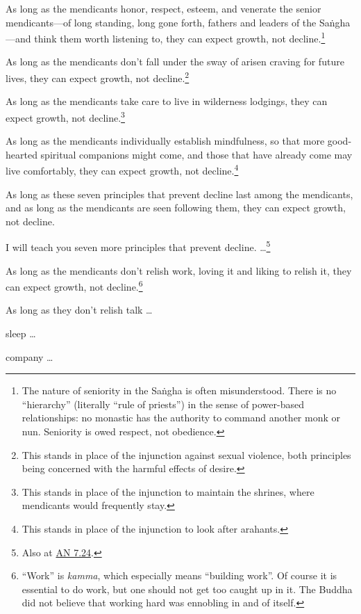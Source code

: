 \documentclass[12pt,openany]{book}%
\begin{document}
As long as the mendicants honor, respect, esteem, and venerate the senior mendicants—of long standing, long gone forth, fathers and leaders of the \textsanskrit{Saṅgha}—and think them worth listening to, they can expect growth, not decline.\footnote{The nature of seniority in the \textsanskrit{Saṅgha} is often misunderstood. There is no “hierarchy” (literally “rule of priests”) in the sense of power-based relationships: no monastic has the authority to command another monk or nun. Seniority is owed respect, not obedience. } 

As long as the mendicants don’t fall under the sway of arisen craving for future lives, they can expect growth, not decline.\footnote{This stands in place of the injunction against sexual violence, both principles being concerned with the harmful effects of desire. } 

As long as the mendicants take care to live in wilderness lodgings, they can expect growth, not decline.\footnote{This stands in place of the injunction to maintain the shrines, where mendicants would frequently stay. } 

As long as the mendicants individually establish mindfulness, so that more good-hearted spiritual companions might come, and those that have already come may live comfortably, they can expect growth, not decline.\footnote{This stands in place of the injunction to look after arahants. } 

As long as these seven principles that prevent decline last among the mendicants, and as long as the mendicants are seen following them, they can expect growth, not decline. 

I will teach you seven more principles that prevent decline. …\footnote{Also at \href{https://suttacentral.net/an7.24/en/sujato}{AN 7.24}. } 

As long as the mendicants don’t relish work, loving it and liking to relish it, they can expect growth, not decline.\footnote{“Work” is \textit{kamma}, which especially means “building work”. Of course it is essential to do work, but one should not get too caught up in it. The Buddha did not believe that working hard was ennobling in and of itself. } 

As long as they don’t relish talk … 

sleep … 

company … 
\end{document}
